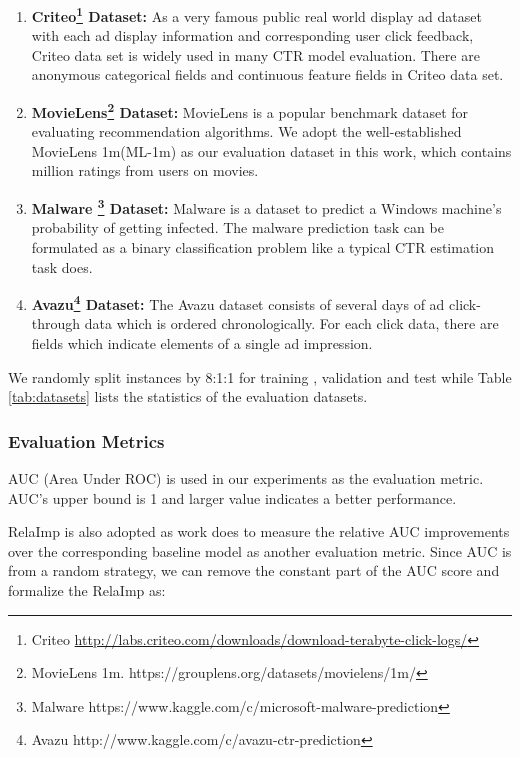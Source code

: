 \documentclass[sigconf]{acmart}
\begin{document}
\begin{enumerate}
  \item \textbf{Criteo\footnote{Criteo \url{http://labs.criteo.com/downloads/download-terabyte-click-logs/}} Dataset:}
  As a very famous public real world display ad dataset with each ad display information and corresponding user click feedback, Criteo data set is widely used in many CTR model evaluation.  There are  anonymous categorical fields and  continuous feature fields in Criteo data set.

  \item \textbf{MovieLens\footnote{MovieLens 1m.   https://grouplens.org/datasets/movielens/1m/} Dataset:}
  MovieLens is a popular benchmark dataset for evaluating recommendation algorithms. We adopt the well-established MovieLens 1m(ML-1m) as our evaluation dataset in this work, which contains  million ratings from  users on  movies.

  \item \textbf{Malware \footnote{Malware https://www.kaggle.com/c/microsoft-malware-prediction} Dataset:}
Malware is a dataset to predict a Windows machine's probability of getting infected. The malware prediction task can be formulated as a binary classification problem like a typical CTR estimation task does.


  \item \textbf{Avazu\footnote{Avazu http://www.kaggle.com/c/avazu-ctr-prediction} Dataset:}
    The Avazu dataset consists of several days of ad click-through data which is ordered chronologically. For each click data, there are  fields which indicate elements of a single ad impression.
\end{enumerate}




We randomly split instances by 8:1:1 for training , validation and test while Table \ref{tab:datasets} lists the statistics of the evaluation datasets.







\subsubsection{Evaluation Metrics}


AUC (Area Under ROC) is used in our experiments as the evaluation metric. AUC's upper bound is 1 and larger value indicates a better performance.


RelaImp is also adopted as work \cite{inproceedings} does to measure the relative AUC improvements over the corresponding baseline model as another evaluation metric. Since AUC is  from a random strategy, we can remove the constant part of the AUC score and formalize the RelaImp as:
\end{document}
